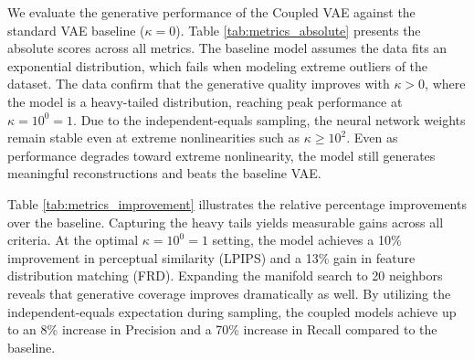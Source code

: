 \documentclass[twoside,11pt]{article}
\begin{document}
We evaluate the generative performance of the Coupled VAE against the standard VAE baseline ($\kappa=0$). Table \ref{tab:metrics_absolute} presents the absolute scores across all metrics. The baseline model assumes the data fits an exponential distribution, which fails when modeling extreme outliers of the dataset. The data confirm that the generative quality improves with $\kappa > 0$, where the model is a heavy-tailed distribution, reaching peak performance at $\kappa = 10^0 = 1$. Due to the independent-equals sampling, the neural network weights remain stable even at extreme nonlinearities such as $\kappa \ge 10^2$. Even as performance degrades toward extreme nonlinearity, the model still generates meaningful reconstructions and beats the baseline VAE. 

Table \ref{tab:metrics_improvement} illustrates the relative percentage improvements over the baseline. Capturing the heavy tails yields measurable gains across all criteria. At the optimal $\kappa = 10^0 = 1$ setting, the model achieves a 10\% improvement in perceptual similarity (LPIPS) and a 13\% gain in feature distribution matching (FRD). Expanding the manifold search to 20 neighbors reveals that generative coverage improves dramatically as well. By utilizing the independent-equals expectation during sampling, the coupled models achieve up to an 8\% increase in Precision and a 70\% increase in Recall compared to the baseline.
\end{document}
